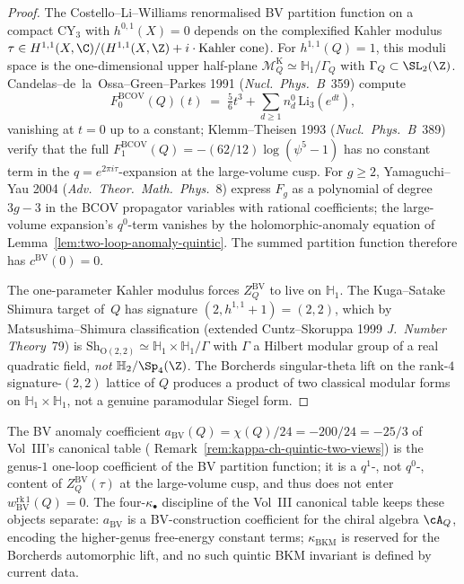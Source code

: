\begin{proof}
The Costello--Li--Williams renormalised BV partition function on a
compact CY$_3$ with $h^{0, 1}(X) = 0$ depends on the complexified
Kahler modulus $\tau \in H^{1, 1}(X, \C) / (H^{1, 1}(X, \Z) + i
\cdot \mathrm{Kahler\ cone})$. For $h^{1, 1}(Q) = 1$, this moduli
space is the one-dimensional upper half-plane
$\mathcal{M}_Q^{\mathrm{K}} \simeq \mathbb{H}_1 / \Gamma_Q$ with
$\Gamma_Q \subset \SL_2(\Z)$. Candelas--de~la~Ossa--Green--Parkes
1991 (\emph{Nucl.\ Phys.\ B}~359) compute
\[
 F_0^{\mathrm{BCOV}}(Q)(t) \;=\; \tfrac{5}{6} t^3 + \sum_{d \geq 1}
 n^0_d \,\mathrm{Li}_3(e^{d t}),
\]
vanishing at $t = 0$ up to a constant; Klemm--Theisen 1993
(\emph{Nucl.\ Phys.\ B}~389) verify that the full
$F_1^{\mathrm{BCOV}}(Q) = -(62/12) \log(\psi^5 - 1)$ has no
constant term in the $q = e^{2\pi i \tau}$-expansion at the
large-volume cusp. For $g \geq 2$, Yamaguchi--Yau 2004
(\emph{Adv.\ Theor.\ Math.\ Phys.}~8) express $F_g$ as a polynomial
of degree $3g - 3$ in the BCOV propagator variables with rational
coefficients; the large-volume expansion's $q^0$-term vanishes by
the holomorphic-anomaly equation of
Lemma~\ref{lem:two-loop-anomaly-quintic}. The summed partition
function therefore has $c^{\mathrm{BV}}(0) = 0$.

The one-parameter Kahler modulus forces $Z^{\mathrm{BV}}_Q$ to
live on $\mathbb{H}_1$. The Kuga--Satake Shimura target of~$Q$
has signature $(2, h^{1, 1} + 1) = (2, 2)$, which by
Matsushima--Shimura classification (extended Cuntz--Skoruppa 1999
\emph{J.\ Number Theory}~79) is
$\mathrm{Sh}_{\mathrm{O}(2, 2)} \simeq \mathbb{H}_1 \times
\mathbb{H}_1 / \Gamma$ with $\Gamma$ a Hilbert modular group of a
real quadratic field, \emph{not} $\mathbb{H}_2 / \Sp_4(\Z)$. The
Borcherds singular-theta lift on the rank-$4$ signature-$(2, 2)$
lattice of $Q$ produces a product of two classical modular forms
on $\mathbb{H}_1 \times \mathbb{H}_1$, not a genuine paramodular
Siegel form.
\end{proof}

\begin{remark}[$a_{\mathrm{BV}}(Q) = -25/3$ lives
in higher Fourier coefficients]
\label{rem:quintic-kch-bv-higher-fourier}
The BV anomaly coefficient $a_{\mathrm{BV}}(Q) =
\chi(Q)/24 = -200/24 = -25/3$ of Vol~III's canonical table
(\cite{VolI}
Remark~\ref{rem:kappa-ch-quintic-two-views}) is the genus-$1$
one-loop coefficient of the BV partition function; it is a
$q^1$-, not $q^0$-, content of $Z^{\mathrm{BV}}_Q(\tau)$ at the
large-volume cusp, and thus does not enter
$w_{\mathrm{BV}}^{\mathrm{rk}\,1}(Q) = 0$. The
four-$\kappa_\bullet$ discipline of the Vol~III canonical table keeps these
objects separate: $a_{\mathrm{BV}}$ is a BV-construction coefficient
for the chiral algebra $\cA_Q$, encoding the higher-genus
free-energy constant terms; $\kappa_{\mathrm{BKM}}$ is reserved for
the Borcherds automorphic lift, and no such quintic BKM invariant is
defined by current data.
\end{remark}

